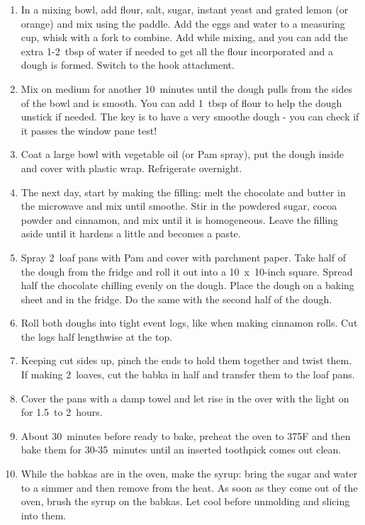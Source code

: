 \begin{enumerate}
    \item In a mixing bowl, add flour, salt, sugar, instant yeast and grated lemon (or orange) and mix using the paddle. Add the eggs and water to a measuring cup, whisk with a fork to combine. Add while mixing, and you can add the extra 1-2~tbsp of water if needed to get all the flour incorporated and a dough is formed. Switch to the hook attachment.
    \item Mix on medium for another 10~minutes until the dough pulls from the sides of the bowl and is smooth. You can add 1~tbsp of flour to help the dough unstick if needed. The key is to have a very smoothe dough - you can check if it passes the window pane test!
    \item Coat a large bowl with vegetable oil (or Pam spray), put the dough inside and cover with plastic wrap. Refrigerate overnight.
    \item The next day, start by making the filling: melt the chocolate and butter in the microwave and mix until smoothe. Stir in the powdered sugar, cocoa powder and cinnamon, and mix until it is homogeneous. Leave the filling aside until it hardens a little and becomes a paste.
    \item Spray 2~loaf pans with Pam and cover with parchment paper. Take half of the dough from the fridge and roll it out into a 10~x~10-inch square. Spread half the chocolate chilling evenly on the dough. Place the dough on a baking sheet and in the fridge. Do the same with the second half of the dough.
    \item Roll both doughs into tight event logs, like when making cinnamon rolls. Cut the logs half lengthwise at the top.
    \item Keeping cut sides up, pinch the ends to hold them together and twist them. If making 2~loaves, cut the babka in half and transfer them to the loaf pans.
    \item Cover the pans with a damp towel and let rise in the over with the light on for 1.5~to 2~hours.
    \item About 30~minutes before ready to bake, preheat the oven to 375\degree F and then bake them for 30-35~minutes until an inserted toothpick comes out clean.
    \item While the babkas are in the oven, make the syrup: bring the sugar and water to a simmer and then remove from the heat. As soon as they come out of the oven, brush the syrup on the babkas. Let cool before unmolding and slicing into them.
\end{enumerate}

